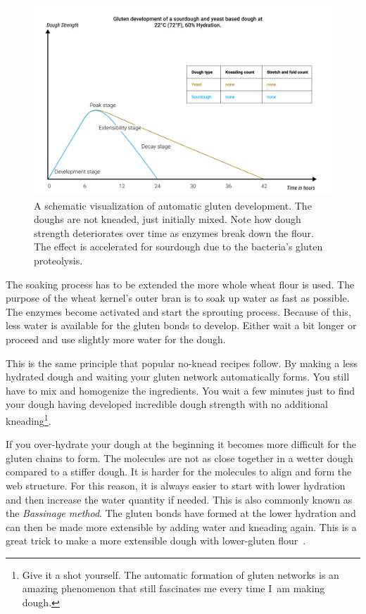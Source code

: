 \begin{figure}[!htb]
  \includegraphics[width=\textwidth]{dough-strength-sourdough-yeast}
  \caption{A schematic visualization of
  automatic gluten development. The doughs are not kneaded, just initially
  mixed. Note how dough strength
  deteriorates over time as enzymes break down the flour. The effect
  is accelerated for sourdough due to the bacteria's gluten proteolysis.}%
  \label{fig:wheat-yeast-sourdough-degradation}
\end{figure}

The soaking process has to be extended the more whole wheat flour is used.
The purpose of the wheat kernel's outer bran is to soak up water as fast
as possible. The enzymes become activated and start the sprouting process.
Because of this, less water is available for the gluten bonds to develop.
Either wait a bit longer or proceed and use slightly more water for
the dough.

This is the same principle that popular no-knead recipes follow. By making a less
hydrated dough and waiting your gluten network automatically forms. You still
have to mix and homogenize the ingredients. You wait a few minutes just to
find your dough having developed incredible dough strength with no additional
kneading\footnote{Give it a shot yourself. The automatic formation of gluten
networks is an amazing phenomenon that still fascinates me every time I~am
making dough.}.

If you over-hydrate your dough at the beginning it becomes more difficult
for the gluten chains to form. The molecules are not as close together in
a wetter dough compared to a stiffer dough. It is harder for the molecules
to align and form the web structure. For this reason, it is always easier
to start with lower hydration and then increase the water quantity if needed.
This is also commonly known as the \emph{Bassinage method}. The gluten
bonds have formed at the lower hydration and can then be made more extensible
by adding water and kneading again. This is a great trick to make
a more extensible dough with lower-gluten flour~\cite{bassinage+technique}.

